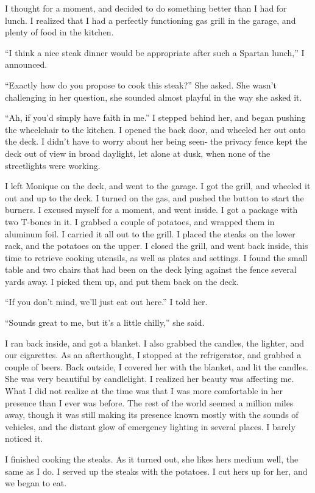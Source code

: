 I thought for a moment, and decided to do something better than I had for lunch. I realized
that I had a perfectly functioning gas grill in the garage, and plenty of food in the kitchen.

``I think a nice steak dinner would be appropriate after such a Spartan lunch,'' I
announced.

``Exactly how do you propose to cook this steak?'' She asked. She wasn't challenging in her
question, she sounded almost playful in the way she asked it.

``Ah, if you'd simply have faith in me.'' I stepped behind her, and began pushing the
wheelchair to the kitchen. I opened the back door, and wheeled her out onto the deck. I didn't
have to worry about her being seen- the privacy fence kept the deck out of view in broad
daylight, let alone at dusk, when none of the streetlights were working.

I left Monique on the deck, and went to the garage. I got the grill, and wheeled it out and
up to the deck. I turned on the gas, and pushed the button to start the burners. I excused
myself for a moment, and went inside. I got a package with two T-bones in it. I grabbed a couple
of potatoes, and wrapped them in aluminum foil. I carried it all out to the grill. I placed the
steaks on the lower rack, and the potatoes on the upper. I closed the grill, and went back
inside, this time to retrieve cooking utensils, as well as plates and settings. I found the
small table and two chairs that had been on the deck lying against the fence several yards away.
I picked them up, and put them back on the deck.

``If you don't mind, we'll just eat out here.'' I told her.

``Sounds great to me, but it's a little chilly,'' she said.

I ran back inside, and got a blanket. I also grabbed the candles, the lighter, and our
cigarettes. As an afterthought, I stopped at the refrigerator, and grabbed a couple of beers.
Back outside, I covered her with the blanket, and lit the candles. She was very beautiful by
candlelight. I realized her beauty was affecting me. What I did not realize at the time was that
I was more comfortable in her presence than I ever was before. The rest of the world seemed a
million miles away, though it was still making its presence known mostly with the sounds of
vehicles, and the distant glow of emergency lighting in several places. I barely noticed it.

I finished cooking the steaks. As it turned out, she likes hers medium well, the same as I
do. I served up the steaks with the potatoes. I cut hers up for her, and we began to eat.


